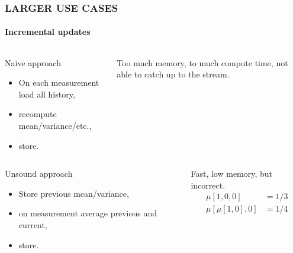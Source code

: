 \documentclass{beamer}
\begin{document}
\begin{frame} \frametitle{LARGER USE CASES}
  \framesubtitle{Incremental updates}
  \begin{columns}[c]
      \begin{block}{Naive approach}
        \begin{itemize}
        \item On each measurement load all history,
        \item recompute mean/variance/etc.,
        \item store.
        \end{itemize}
      \end{block}

  Too much \alert{memory}, to much compute \alert{time}, not able to \alert{catch up}
  to the stream.
  \end{columns}

  \pause

  \begin{columns}[c]
      \begin{block}{Unsound approach}
        \begin{itemize}
        \item Store previous mean/variance,
        \item on measurement average previous and current,
        \item store.
        \end{itemize}
      \end{block}

    Fast, low memory, but \alert{incorrect}.
    \begin{align*}
      \mu[1,0,0] & = 1/3 \\
      \mu[\mu[1,0], 0] &= 1/4
    \end{align*}

  \end{columns}
\end{frame}
\end{document}
